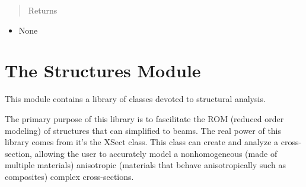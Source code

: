 \documentclass[letterpaper,10pt,english]{sphinxmanual}
\begin{document}
\begin{fulllineitems}
\begin{fulllineitems}
\begin{itemize}
\end{itemize}
\begin{quote}\begin{description}
\item[{Returns}] \leavevmode
\end{description}\end{quote}
\begin{itemize}
\item {} 
None

\end{itemize}

\end{fulllineitems}


\end{fulllineitems}



\chapter{The Structures Module}
\label{structures:the-structures-module}\label{structures::doc}\label{structures:module-AeroComBAT.Structures}
This module contains a library of classes devoted to structural analysis.

The primary purpose of this library is to fascilitate the ROM (reduced order
modeling) of structures that can simplified to beams. The real power of this
library comes from it's the XSect class. This class can create and analyze
a cross-section, allowing the user to accurately model a nonhomogeneous
(made of multiple materials) anisotropic (materials that behave anisotropically
such as composites) complex cross-sections.
\end{document}

